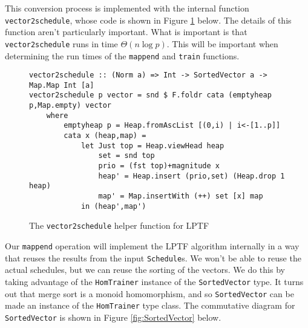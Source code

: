 \documentclass[tikz]{tmr}
\newcommand\h{\lstinline}
\newcommand\+{\mdoubleplus}
\begin{document}
\begin{figure}[H]
{
\vspace{0.1in}
}
\end{figure}

This conversion process is implemented with the internal function \h{vector2schedule}, whose code is shown in Figure \ref{code:vector2schedule} below.
The details of this function aren't particularly important.
What is important is that \h{vector2schedule} runs in time $\Theta(n\log p)$.
This will be important when determining the run times of the \h{mappend} and \h{train} functions.

\begin{figure}[H]
\caption{The \h{vector2schedule} helper function for LPTF}
\label{code:vector2schedule}
\begin{lstlisting}
vector2schedule :: (Norm a) => Int -> SortedVector a -> Map.Map Int [a]
vector2schedule p vector = snd $ F.foldr cata (emptyheap p,Map.empty) vector
    where
        emptyheap p = Heap.fromAscList [(0,i) | i<-[1..p]]
        cata x (heap,map) = 
            let Just top = Heap.viewHead heap
                set = snd top
                prio = (fst top)+magnitude x
                heap' = Heap.insert (prio,set) (Heap.drop 1 heap)
                map' = Map.insertWith (++) set [x] map
            in (heap',map')

\end{lstlisting}
\end{figure}

Our \h{mappend} operation will implement the LPTF algorithm internally in a way that reuses the results from the input \h{Schedule}s.
We won't be able to reuse the actual schedules, but we can reuse the sorting of the vectors.
We do this by taking advantage of the \h{HomTrainer} instance of the \h{SortedVector} type.
It turns out that merge sort is a monoid homomorphism, and so \h{SortedVector} can be made an instance of the \h{HomTrainer} type class.
The commutative diagram for \h{SortedVector} is shown in Figure \ref{fig:SortedVector} below.
\end{document}
